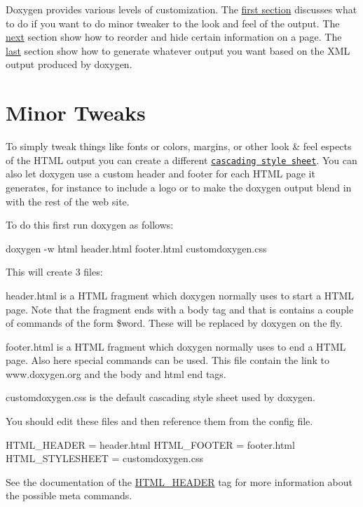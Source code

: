 Doxygen provides various levels of customization. The \hyperlink{customize_minor_tweaks}{first section} discusses what to do if you want to do minor tweaker to the look and feel of the output. The \hyperlink{customize_layout}{next} section show how to reorder and hide certain information on a page. The \hyperlink{customize_xmlgenerator}{last} section show how to generate whatever output you want based on the XML output produced by doxygen.\hypertarget{customize_minor_tweaks}{}\section{Minor Tweaks}\label{customize_minor_tweaks}
To simply tweak things like fonts or colors, margins, or other look \& feel espects of the HTML output you can create a different \href{http://www.w3schools.com/css/default.asp}{\tt cascading style sheet}. You can also let doxygen use a custom header and footer for each HTML page it generates, for instance to include a logo or to make the doxygen output blend in with the rest of the web site.

To do this first run doxygen as follows: \begin{DoxyVerb}
doxygen -w html header.html footer.html customdoxygen.css 
\end{DoxyVerb}


This will create 3 files:
\begin{DoxyItemize}
\item header.html is a HTML fragment which doxygen normally uses to start a HTML page. Note that the fragment ends with a body tag and that is contains a couple of commands of the form \$word. These will be replaced by doxygen on the fly.
\item footer.html is a HTML fragment which doxygen normally uses to end a HTML page. Also here special commands can be used. This file contain the link to www.doxygen.org and the body and html end tags.
\item customdoxygen.css is the default cascading style sheet used by doxygen.
\end{DoxyItemize}

You should edit these files and then reference them from the config file. \begin{DoxyVerb}
HTML_HEADER      = header.html
HTML_FOOTER      = footer.html
HTML_STYLESHEET  = customdoxygen.css
\end{DoxyVerb}


See the documentation of the \hyperlink{config_cfg_html_header}{HTML\_\-HEADER} tag for more information about the possible meta commands.

